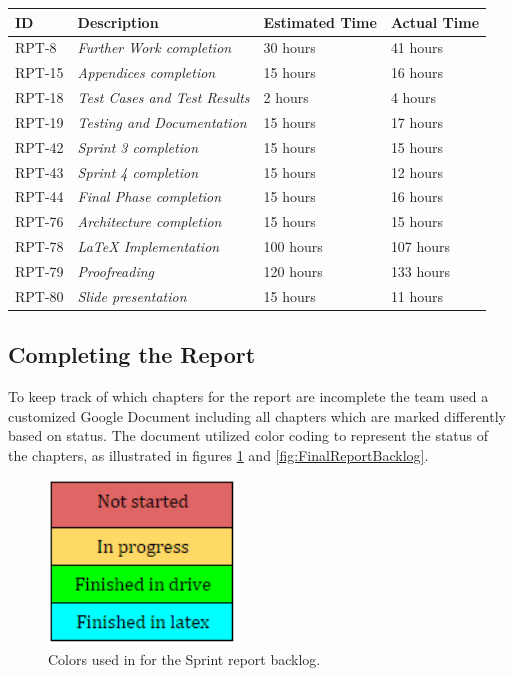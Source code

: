 \begin{minipage}{\linewidth}
\setlength{\tabcolsep}{12pt}
\centering
{}
\begin{tabular}{|p{1cm}|p{4cm}|p{2cm}|p{2cm}|}
\hline
\cellcolor{gray!25} ID & \cellcolor{gray!25} Description & \cellcolor{gray!25} Estimated Time & \cellcolor{gray!25} Actual Time \\
\hline
RPT-8 & \it{Further Work completion} & 30 hours & 41 hours\\
RPT-15 & \it{Appendices completion} & 15 hours & 16 hours \\
RPT-18 & \it{Test Cases and Test Results} &  2 hours & 4 hours \\
RPT-19 & \it{Testing and Documentation} & 15 hours & 17 hours \\
RPT-42 & \it{Sprint 3 completion} & 15 hours & 15 hours \\
RPT-43 & \it{Sprint 4 completion} & 15 hours & 12 hours \\
RPT-44 & \it{Final Phase completion} & 15 hours & 16 hours \\
RPT-76 & \it{Architecture completion} & 15 hours & 15 hours \\
RPT-78 & \it{LaTeX Implementation} & 100 hours &  107 hours \\
RPT-79 & \it{Proofreading} & 120 hours &  133 hours \\
RPT-80 & \it{Slide presentation} & 15 hours & 11 hours \\
\hline
\end{tabular}
\end{minipage}

\subsection{Completing the Report}
\label{sec:FinalReport}

To keep track of which chapters for the report are incomplete the team used a customized Google Document including all chapters which are marked differently based on status. The document utilized color coding to represent the status of the chapters, as illustrated in figures \ref{fig:FinalColors} and \ref{fig:FinalReportBacklog}.

\begin{figure}[ht!]
\centering
\includegraphics[width=50mm]{./FinalSprint/img/Colors.png}
\caption{Colors used in for the Sprint report backlog. \label{fig:FinalColors}}
\end{figure}

